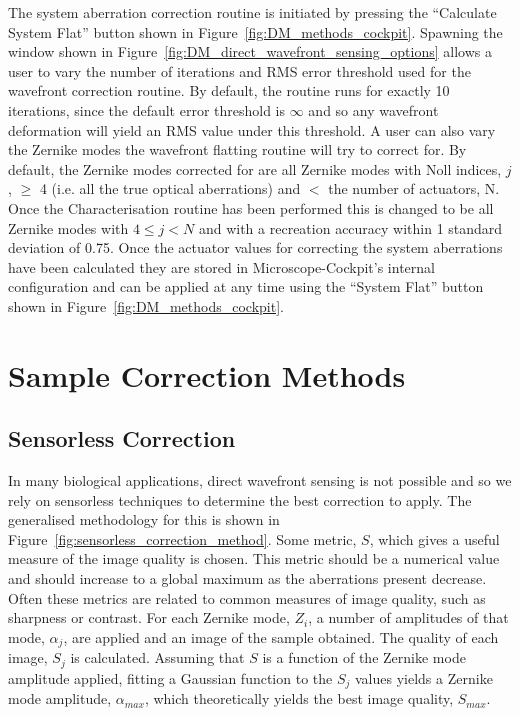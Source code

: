 The system aberration correction routine is initiated by pressing the ``Calculate System Flat'' button shown in Figure~\ref{fig:DM_methods_cockpit}. Spawning the window shown in Figure~\ref{fig:DM_direct_wavefront_sensing_options} allows a user to vary the number of iterations and RMS error threshold used for the wavefront correction routine. By default, the routine runs for exactly 10 iterations, since the default error threshold is $\infty$ and so any wavefront deformation will yield an RMS value under this threshold. A user can also vary the Zernike modes the wavefront flatting routine will try to correct for. By default, the Zernike modes corrected for are all Zernike modes with Noll indices, $j$, $\ge$ 4 (i.e. all the true optical aberrations) and $<$ the number of actuators, N. Once the Characterisation routine has been performed this is changed to be all Zernike modes with $4 \le j < N$ and with a recreation accuracy within 1 standard deviation of 0.75.  Once the actuator values for correcting the system aberrations have been calculated they are stored in Microscope-Cockpit's internal configuration and can be applied at any time using the ``System Flat'' button shown in Figure~\ref{fig:DM_methods_cockpit}.

\section{Sample Correction Methods}
\label{sec:sample_correction_methods}

\subsection{Sensorless Correction}
\label{subsec:sensorless_correction}

In many biological applications, direct wavefront sensing is not possible and so we rely on sensorless techniques to determine the best correction to apply. The generalised methodology for this is shown in Figure~\ref{fig:sensorless_correction_method}. Some metric, $S$, which gives a useful measure of the image quality is chosen. This metric should be a numerical value and should 
increase to a global maximum as the aberrations present decrease. Often these metrics are related to common measures of image quality, such as sharpness or contrast. For each Zernike mode, $Z_{i}$, a number of amplitudes of that mode, $\alpha_{j}$, are applied and an image of the sample obtained. The quality of each image, $S_{j}$ is calculated. Assuming that $S$ is a function of the Zernike mode amplitude applied,	fitting a Gaussian function to the $S_{j}$ values yields a Zernike mode amplitude, $\alpha_{max}$, which theoretically yields the best image quality, $S_{max}$. 

